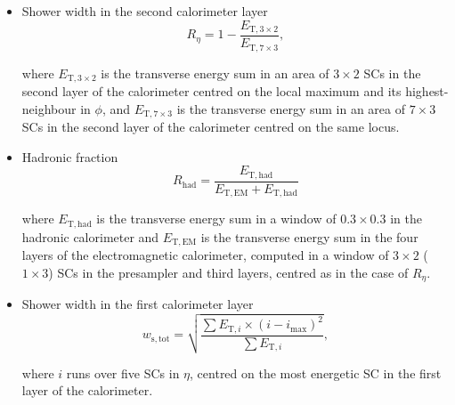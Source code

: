 \documentclass[cernpreprint, atlasdraft=false, UKenglish,british,orcidlogo, texmf, orcidlogo]{atlasdoc}
\begin{document}
\begin{itemize}
\item Shower width in the second calorimeter layer \begin{equation} R_{\eta} = 1 - \frac{E_{\mathrm{T}, 3 \times 2}}{E_{\mathrm{T}, 7 \times 3}},\end{equation}
 
where $E_{\mathrm{T}, 3 \times 2}$ is the transverse energy sum in an area of $3 \times 2$ \glspl{SC} in the second layer of the calorimeter centred on the local maximum and its highest-\ET neighbour in $\phi$, and $E_{\mathrm{T}, 7 \times 3}$ is the transverse energy sum in an area of $7 \times 3$ \glspl{SC} in the second layer of the calorimeter centred on the same locus.
 
\item Hadronic fraction \begin{equation} R_{\mathrm{had}} = \frac{E_{\mathrm{T,had}}}{E_{\mathrm{T,EM}}+E_{\mathrm{T,had}}} \end{equation}
 
where $E_{\mathrm{T,had}}$ is the transverse energy sum in a window of $0.3 \times 0.3$ in the hadronic calorimeter and $E_{\mathrm{T,EM}}$ is the transverse energy sum in the four layers of the electromagnetic calorimeter, computed in a window of $3 \times 2$ ($1 \times 3$) \glspl{SC} in the presampler and third layers, centred as in the case of $R_\eta$.
 
\item Shower width in the first calorimeter layer \begin{equation} w_{\mathrm{s, tot}} = \sqrt{\frac{\sum{E_{\mathrm{T},i} \times (i-i_{\mathrm{max}})}^2}{\sum{E_{\mathrm{T},i}}}},\end{equation}
 
where $i$ runs over five \glspl{SC} in $\eta$, centred on the most energetic \gls{SC} in the first layer of the calorimeter.
 
 
 
\end{itemize}
 
\end{document}
